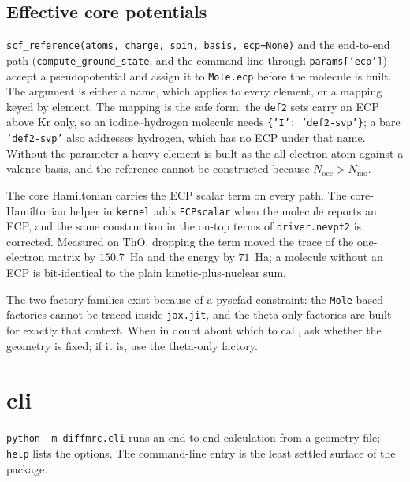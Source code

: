 \subsection{Effective core potentials}
\label{sec:api-ecp}

\texttt{scf\_reference(atoms, charge, spin, basis, ecp=None)} and the
end-to-end path (\texttt{compute\_ground\_state}, and the command line
through \texttt{params['ecp']}) accept a pseudopotential and assign it
to \texttt{Mole.ecp} before the molecule is built.  The argument is
either a name, which applies to every element, or a mapping keyed by
element.  The mapping is the safe form: the \texttt{def2} sets carry
an ECP above Kr only, so an iodine--hydrogen molecule needs
\texttt{\{'I': 'def2-svp'\}}; a bare \texttt{'def2-svp'} also addresses
hydrogen, which has no ECP under that name.  Without the parameter a
heavy element is built as the all-electron atom against a valence
basis, and the reference cannot be constructed because
$N_{\mathrm{occ}} > N_{\mathrm{mo}}$.

The core Hamiltonian carries the ECP scalar term on every path.  The
core-Hamiltonian helper in \texttt{kernel} adds \texttt{ECPscalar}
when the molecule reports an ECP, and the same construction in the
on-top terms of \texttt{driver.nevpt2} is corrected.  Measured on ThO, dropping the
term moved the trace of the one-electron matrix by $150.7$~Ha and the
energy by $71$~Ha; a molecule without an ECP is bit-identical to the
plain kinetic-plus-nuclear sum.

The two factory families exist because of a pyscfad constraint: the
\texttt{Mole}-based factories cannot be traced inside
\texttt{jax.jit}, and the theta-only factories are built for exactly
that context.  When in doubt about which to call, ask whether the
geometry is fixed; if it is, use the theta-only factory.

\section{cli}

\texttt{python -m diffmrc.cli} runs an end-to-end calculation from a
geometry file; \texttt{--help} lists the options.  The command-line
entry is the least settled surface of the package.
